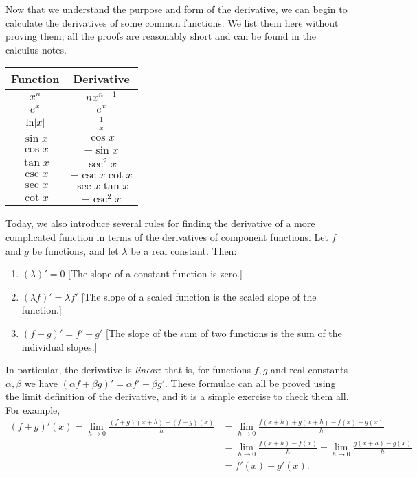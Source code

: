 


Now that we understand the purpose and form of the derivative, we can begin to calculate
the derivatives of some common functions. We list them here without proving them; all the
proofs are reasonably short and can be found in the calculus notes.

\begin{center}
  \def\arraystretch{1.5}
  \begin{tabular}{|c|c|}\hline
    \textbf{Function} & \textbf{Derivative}\\\hline
    $ x^n $ & $ nx^{n - 1} $\\\hline
    $ e^x $ & $ e^x $\\\hline
    $ \ln \abs{x} $ & $ \frac{1}{x} $\\\hline
    $ \sin x $ & $ \cos x $\\\hline
    $ \cos x $ & $ -\sin x $\\\hline
    $ \tan x $ & $ \sec^2 x $\\\hline
    $ \csc x $ & $ -\csc x \cot x $\\\hline
    $ \sec x $ & $ \sec x \tan x $\\\hline
    $ \cot x $ & $ -\csc^2 x $\\\hline
  \end{tabular}
\end{center}

Today, we also introduce several rules for finding the derivative of a more complicated function
in terms of the derivatives of component functions. Let $ f $ and $ g $ be functions, and let $ \lambda $ be a real constant. Then:
\begin{enumerate}
  \item $ (\lambda)' = 0 $ [The slope of a constant function is zero.]
  \item $ (\lambda f)' = \lambda f' $ [The slope of a scaled function is the scaled slope of the function.]
  \item $ (f + g)' = f' + g' $ [The slope of the sum of two functions is the sum of the individual slopes.]
\end{enumerate}
In particular, the derivative is \textit{linear}: that is, for functions $ f, g $ and real constants $ \alpha, \beta $
we have $ (\alpha f + \beta g)' = \alpha f' + \beta g' $. These formulae can all be proved using the limit definition
of the derivative, and it is a simple exercise to check them all. For example,
\begin{align*}
  (f + g)'(x) = \lim_{h \to 0} \frac{(f + g)(x + h) - (f + g)(x)}{h} &= \lim_{h \to 0} \frac{f(x + h) + g(x + h) - f(x) - g(x)}{h} \\
                                                                     &= \lim_{h \to 0} \frac{f(x + h) - f(x)}{h} + \lim_{h \to 0} \frac{g(x + h) - g(x)}{h} \\
                                                                     &= f'(x) + g'(x).
\end{align*}

